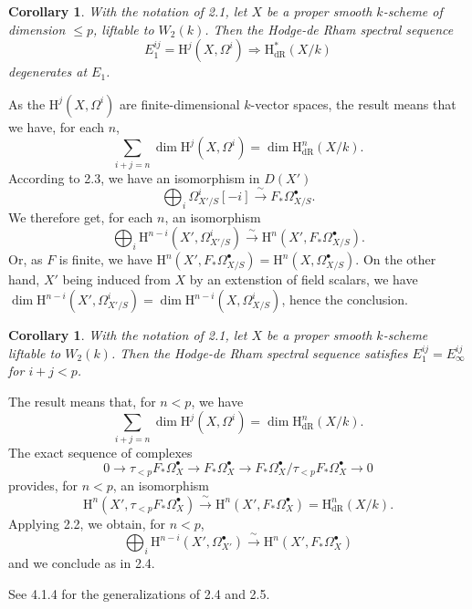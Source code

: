 \documentclass[10pt,reqno]{article}
\newcommand{\dR}{\mathrm{dR}}
\renewcommand{\H}{\mathrm{H}}
\newcommand{\ah}{^\ast}
\newcommand{\al}{_\ast}
\newcommand{\bh}{^\bullet}
\theoremstyle{plain}
\newtheorem{coro}[thm]{Corollary}
\theoremstyle{definition}
\begin{document}
\begin{coro}
With the notation of 2.1, let $X$ be a proper smooth $k$-scheme of dimension $\leq p$, liftable to $W_2(k)$. Then
the Hodge-de Rham spectral sequence
\[
  E_1^{ij}=\H^j(X,\Omega^i)\Longrightarrow\H_\dR\ah(X/k)\tag{2.4.1}
\]
degenerates at $E_1$.
\end{coro}
As the $\H^j(X,\Omega^i)$ are finite-dimensional $k$-vector spaces, the result means that we have, for each $n$,
\[
  \sum_{i+j=n}\dim\H^j(X,\Omega^i)=\dim\H_\dR^n(X/k).
\]
According to 2.3, we have an isomorphism in $D(X')$
\[
  \bigoplus_i\Omega_{X'/S}^i[-i]\xrightarrow{\ \sim\ }F\al\Omega_{X/S}\bh.
\]
We therefore get, for each $n$, an isomorphism
\[
  \bigoplus_i\H^{n-i}(X',\Omega_{X'/S}^i)\xrightarrow{\ \sim\ }\H^n(X',F\al\Omega_{X/S}\bh).
\]
Or, as $F$ is finite, we have $\H^n(X',F\al\Omega_{X/S}\bh)=\H^n(X,\Omega_{X/S}\bh)$. On the other hand,
$X'$ being induced from $X$ by an extenstion of field scalars, we have
$\dim\H^{n-i}(X',\Omega_{X'/S}^i)=\dim\H^{n-i}(X,\Omega_{X/S}^i)$, hence the conclusion.

\begin{coro}
With the notation of 2.1, let $X$ be a proper smooth $k$-scheme liftable to $W_2(k)$. Then the
Hodge-de Rham spectral sequence satisfies $E_1^{ij}=E_\infty^{ij}$
for $i+j<p$.
\end{coro}
The result means that, for $n<p$, we have
\[
  \sum_{i+j=n}\dim\H^j(X,\Omega^i)=\dim\H_\dR^n(X/k).
\]
The exact sequence of complexes
\[
  0\longrightarrow\tau_{<p}F\al\Omega_X\bh\longrightarrow F\al\Omega_X\bh\longrightarrow F\al\Omega_X\bh/\tau_{<p}F\al\Omega_X\bh\longrightarrow 0
\]
provides, for $n<p$, an isomorphism
\[
  \H^n(X',\tau_{<p}F\al\Omega_X\bh)\xrightarrow{\ \sim\ }\H^n(X',F\al\Omega_X\bh)=\H_\dR^n(X/k).
\]
Applying 2.2, we obtain, for $n<p$,
\[
  \bigoplus_i\H^{n-i}(X',\Omega_{X'}\bh)\xrightarrow{\ \sim\ }\H^n(X',F\al\Omega_X\bh)
\]
and we conclude as in 2.4.

\noindent
See 4.1.4 for the generalizations of 2.4 and 2.5.
\end{document}
